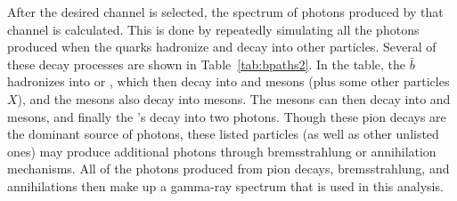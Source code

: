     After the desired channel is selected, the spectrum of photons produced by that channel is calculated.
    This is done by repeatedly simulating all the photons produced when the \bbbar quarks hadronize and decay into other particles.
    Several of these decay processes are shown in Table~\ref{tab:bpaths2}.
    In the table, the $\bar{b}$ hadronizes into \PBplus or \PBzero, which then decay into \PK and \PD mesons (plus some other particles $X$), and the \PD mesons also decay into \PK mesons.
    The \PK mesons can then decay into \Ppipm and \Ppizero mesons, and finally the \Ppizero{}'s decay into two photons.
    Though these pion decays are the dominant source of photons, these listed particles (as well as other unlisted ones) may produce additional photons through bremsstrahlung or annihilation mechanisms.
    All of the photons produced from pion decays, bremsstrahlung, and annihilations then make up a gamma-ray spectrum that is used in this analysis.
    
